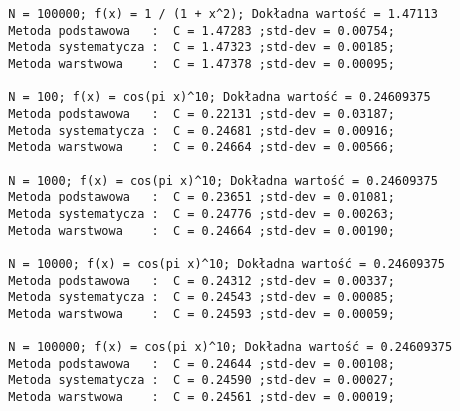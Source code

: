 \documentclass[a4paper, 12pt]{article}
\begin{document}
\begin{verbatim}
        N = 100000; f(x) = 1 / (1 + x^2); Dokładna wartość = 1.47113
        Metoda podstawowa   :  C = 1.47283 ;std-dev = 0.00754;
        Metoda systematycza :  C = 1.47323 ;std-dev = 0.00185;
        Metoda warstwowa    :  C = 1.47378 ;std-dev = 0.00095;
        
        N = 100; f(x) = cos(pi x)^10; Dokładna wartość = 0.24609375
        Metoda podstawowa   :  C = 0.22131 ;std-dev = 0.03187;
        Metoda systematycza :  C = 0.24681 ;std-dev = 0.00916;
        Metoda warstwowa    :  C = 0.24664 ;std-dev = 0.00566;
        
        N = 1000; f(x) = cos(pi x)^10; Dokładna wartość = 0.24609375
        Metoda podstawowa   :  C = 0.23651 ;std-dev = 0.01081;
        Metoda systematycza :  C = 0.24776 ;std-dev = 0.00263;
        Metoda warstwowa    :  C = 0.24664 ;std-dev = 0.00190;
        
        N = 10000; f(x) = cos(pi x)^10; Dokładna wartość = 0.24609375
        Metoda podstawowa   :  C = 0.24312 ;std-dev = 0.00337;
        Metoda systematycza :  C = 0.24543 ;std-dev = 0.00085;
        Metoda warstwowa    :  C = 0.24593 ;std-dev = 0.00059;
        
        N = 100000; f(x) = cos(pi x)^10; Dokładna wartość = 0.24609375
        Metoda podstawowa   :  C = 0.24644 ;std-dev = 0.00108;
        Metoda systematycza :  C = 0.24590 ;std-dev = 0.00027;
        Metoda warstwowa    :  C = 0.24561 ;std-dev = 0.00019;
\end{verbatim}           
\end{document}
